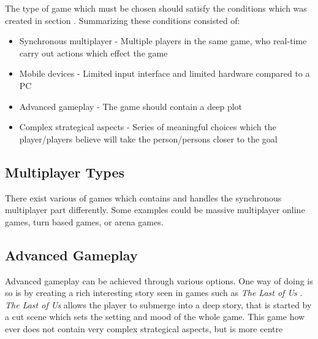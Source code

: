 The type of game which must be chosen should satisfy the conditions which was created in section \cite{sec:specifyingtheproblemstatement}.
Summarizing these conditions consisted of:
\begin{itemize}
\item Synchronous multiplayer - Multiple players in the same game, who real-time carry out actions which effect the game
\item Mobile devices - Limited input interface and limited hardware compared to a PC
\item Advanced gameplay - The game should contain a deep plot
\item Complex strategical aspects - Series of meaningful choices which the player/players believe will take the person/persons closer to the goal
\end{itemize}

\subsection{Multiplayer Types}
There exist various of games which contains and handles the synchronous multiplayer part differently. Some examples could be massive multiplayer online games, turn based games, or arena games. 


\subsection{Advanced Gameplay}
Advanced gameplay can be achieved through various options. One way of doing is so is by creating a rich interesting story seen in games such as \textit{The Last of Us} .
\textit{The Last of Us} allows the player to submerge into a deep story, that is started by a cut scene which sets the setting and mood of the whole game.
This game how ever does not contain very complex strategical aspects, but is more centre

